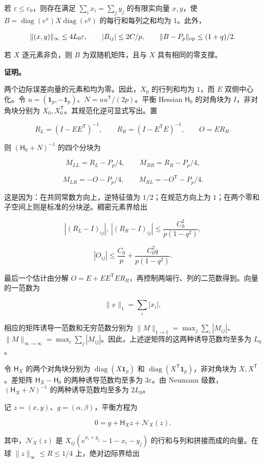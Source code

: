 \documentclass[11pt,a4paper]{article}
\begin{document}
若 \(\varepsilon\le\varepsilon_0\)，则存在满足 \(\sum_i x_i=\sum_j y_j\) 的有限实向量 \(x,y\)，使 \(B=\operatorname{diag}(e^x)X\operatorname{diag}(e^y)\) 的每行和每列之和均为 \(1\)。此外，

\[
\|(x,y)\|_\infty\le4L_0\varepsilon,\qquad |B_{ij}|\le2C/p,\qquad \|B-P_p\|_{\rm op}\le(1+q)/2.
\]

若 \(X\) 逐元素非负，则 \(B\) 为双随机矩阵，且与 \(X\) 具有相同的零支撑。

\textbf{证明。}

两个边际误差向量的元素和均为零。因此，\(X_0\) 的行列和均为 \(1\)，而 \(E\) 双侧中心化。令 \(u=(\mathbf 1_p,-\mathbf 1_p)\)、\(N=uu^{\mathsf T}/(2p)\)。平衡 Hessian \(\mathsf H_0\) 的对角块为 \(I\)，非对角块分别为 \(X_0,X_0^{\mathsf T}\)。其规范化逆可显式写出。置

\[
R_L=(I-EE^{\mathsf T})^{-1},\qquad R_R=(I-E^{\mathsf T}E)^{-1},\qquad O=ER_R.
\]

则 \((\mathsf H_0+N)^{-1}\) 的四个分块为

\[
M_{LL}=R_L-P_p/4,\qquad M_{RR}=R_R-P_p/4,
\]

\[
M_{LR}=-O-P_p/4,\qquad M_{RL}=-O^{\mathsf T}-P_p/4.
\]

这是因为：在共同常数方向上，逆特征值为 \(1/2\)；在规范方向上为 \(1\)；在两个零和子空间上则是标准的分块逆。稠密元素界给出

\[
|(R_L-I)_{ij}|,\ |(R_R-I)_{ij}|\le\frac{C_0^2}{p(1-q^2)},
\]

\[
|O_{ij}|\le\frac{C_0}{p}+\frac{C_0^2q}{p(1-q^2)}.
\]

最后一个估计由分解 \(O=E+EE^{\mathsf T}ER_R\)，再控制两端行、列的二范数得到。向量的一范数为

\[
\|x\|_1=\sum_i|x_i|,
\]

相应的矩阵诱导一范数和无穷范数分别为 \(\|M\|_{1\to1}=\max_j\sum_i|M_{ij}|\)、\(\|M\|_{\infty\to\infty}=\max_i\sum_j|M_{ij}|\)。因此，上述逆矩阵的这两种诱导范数均至多为 \(L_0\)。

令 \(\mathsf H_X\) 的两个对角块分别为 \(\operatorname{diag}(X\mathbf 1_p)\) 和 \(\operatorname{diag}(X^{\mathsf T}\mathbf 1_p)\)，非对角块为 \(X,X^{\mathsf T}\)。差矩阵 \(\mathsf H_X-\mathsf H_0\) 的两种诱导范数均至多为 \(3\varepsilon\)。由 Neumann 级数，\((\mathsf H_X+N)^{-1}\) 的两种诱导范数均至多为 \(2L_0\)。

记 \(z=(x,y)\)、\(g=(\alpha,\beta)\)，平衡方程为

\[
0=g+\mathsf H_Xz+\mathcal N_X(z).
\]

其中，\(\mathcal N_X(z)\) 是 \(X_{ij}(e^{x_i+y_j}-1-x_i-y_j)\) 的行和与列和拼接而成的向量。在球 \(\|z\|_\infty\le R\le1/4\) 上，绝对边际界给出
\end{document}
